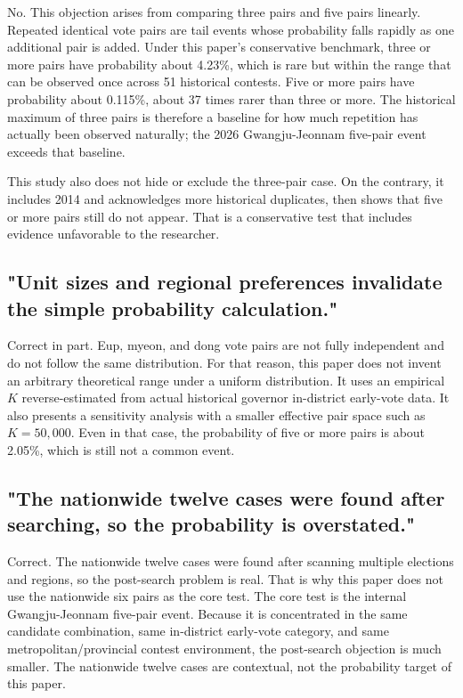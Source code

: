 \documentclass[preprint]{../ieie/IEIE}
\begin{document}
No. This objection arises from comparing three pairs and five pairs linearly. Repeated identical vote pairs are tail events whose probability falls rapidly as one additional pair is added. Under this paper's conservative benchmark, three or more pairs have probability about 4.23\%, which is rare but within the range that can be observed once across 51 historical contests. Five or more pairs have probability about 0.115\%, about 37 times rarer than three or more. The historical maximum of three pairs is therefore a baseline for how much repetition has actually been observed naturally; the 2026 Gwangju-Jeonnam five-pair event exceeds that baseline.

This study also does not hide or exclude the three-pair case. On the contrary, it includes 2014 and acknowledges more historical duplicates, then shows that five or more pairs still do not appear. That is a conservative test that includes evidence unfavorable to the researcher.

\subsection{"Unit sizes and regional preferences invalidate the simple probability calculation."}

Correct in part. Eup, myeon, and dong vote pairs are not fully independent and do not follow the same distribution. For that reason, this paper does not invent an arbitrary theoretical range under a uniform distribution. It uses an empirical \(K\) reverse-estimated from actual historical governor in-district early-vote data. It also presents a sensitivity analysis with a smaller effective pair space such as \(K=50,000\). Even in that case, the probability of five or more pairs is about 2.05\%, which is still not a common event.

\subsection{"The nationwide twelve cases were found after searching, so the probability is overstated."}

Correct. The nationwide twelve cases were found after scanning multiple elections and regions, so the post-search problem is real. That is why this paper does not use the nationwide six pairs as the core test. The core test is the internal Gwangju-Jeonnam five-pair event. Because it is concentrated in the same candidate combination, same in-district early-vote category, and same metropolitan/provincial contest environment, the post-search objection is much smaller. The nationwide twelve cases are contextual, not the probability target of this paper.
\end{document}
